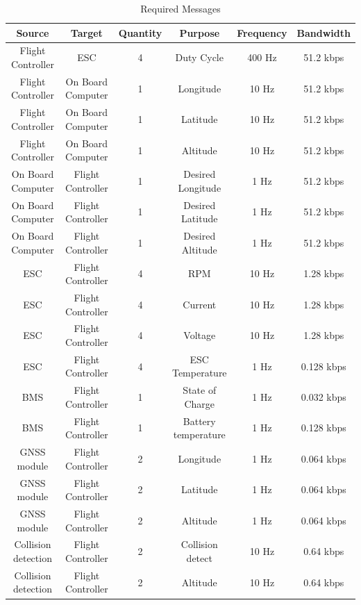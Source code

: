     \begin{table}[]
        \begin{tabular}{|c|c|c|c|c|c|} 
         \textbf{Source}             & \textbf{Target}            & \textbf{Quantity}   & \textbf{Purpose}& \textbf{Frequency} & \textbf{Bandwidth}\\
         \hline
         Flight Controller  & \gls{ESC}         & 4    & Duty Cycle        & 400 Hz & 51.2 kbps \\
         Flight Controller  & On Board Computer & 1    & Longitude         & 10 Hz  & 51.2 kbps \\
         Flight Controller  & On Board Computer & 1    & Latitude         & 10 Hz   & 51.2 kbps \\
         Flight Controller  & On Board Computer & 1    & Altitude         & 10 Hz   & 51.2 kbps \\
         On Board Computer  & Flight Controller & 1    & Desired Longitude & 1 Hz & 51.2 kbps \\
         On Board Computer  & Flight Controller & 1    & Desired Latitude & 1 Hz      & 51.2 kbps \\
         On Board Computer  & Flight Controller & 1    & Desired Altitude & 1 Hz   & 51.2 kbps \\
         \gls{ESC}          & Flight Controller & 4    & \gls{RPM}         & 10 Hz     & 1.28 kbps \\
         \gls{ESC}          & Flight Controller & 4    & Current           & 10 Hz     & 1.28 kbps \\
         \gls{ESC}          & Flight Controller & 4    & Voltage           & 10 Hz     & 1.28 kbps \\
         \gls{ESC}          & Flight Controller & 4    & \gls{ESC} Temperature & 1 Hz    & 0.128 kbps \\
         \gls{BMS}          & Flight Controller & 1    & State of Charge & 1 Hz     & 0.032 kbps \\
         \gls{BMS}          & Flight Controller & 1    & Battery temperature & 1 Hz     & 0.128 kbps \\
         \gls{GNSS} module  & Flight Controller & 2    & Longitude  & 1 Hz       & 0.064 kbps \\
         \gls{GNSS} module  & Flight Controller & 2    & Latitude   & 1 Hz     & 0.064 kbps \\
         \gls{GNSS} module  & Flight Controller & 2    & Altitude   & 1 Hz      & 0.064 kbps \\
         Collision detection  & Flight Controller & 2    & Collision detect  & 10 Hz     & 0.64 kbps \\
         Collision detection& Flight Controller & 2    & Altitude  & 10 Hz      & 0.64 kbps \\
         \hline
        \end{tabular}
        \caption{Required Messages}
        \label{tab:device_comms_requirementsl}
    \end{table}
